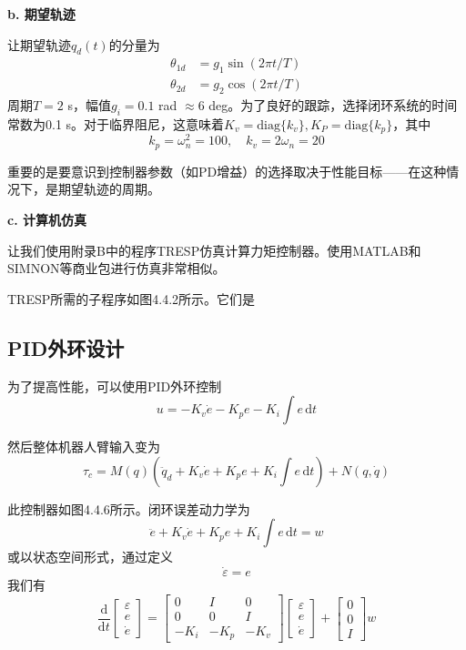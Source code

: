 \documentclass[UTF8]{ctexart}
\theoremstyle{definition}
\newcommand{\dd}{\mathrm{d}}
\begin{document}
\begin{examplebox}[示例4.4-1：PD计算力矩控制的仿真]
\textbf{b. 期望轨迹}

让期望轨迹$q_d(t)$的分量为
\begin{align}
    \theta_{1d} &= g_1\sin(2\pi t/T) \\
    \theta_{2d} &= g_2\cos(2\pi t/T)
\end{align}
周期$T = 2$ s，幅值$g_i = 0.1$ rad $\approx 6$ deg。为了良好的跟踪，选择闭环系统的时间常数为0.1 s。对于临界阻尼，这意味着$K_v = \mathrm{diag}\{k_v\}, K_P = \mathrm{diag}\{k_p\}$，其中
\begin{equation}
    k_p = \omega_n^2 = 100, \quad k_v = 2\omega_n = 20
\end{equation}

重要的是要意识到控制器参数（如PD增益）的选择取决于性能目标——在这种情况下，是期望轨迹的周期。

\textbf{c. 计算机仿真}

让我们使用附录B中的程序TRESP仿真计算力矩控制器。使用MATLAB和SIMNON等商业包进行仿真非常相似。

TRESP所需的子程序如图4.4.2所示。它们是
\end{examplebox}

\subsection{PID外环设计}

为了提高性能，可以使用PID外环控制
\begin{equation}
    u = -K_v\dot{e} - K_pe - K_i\int e\,\dd t
\end{equation}

然后整体机器人臂输入变为
\begin{equation}
    \tau_c = M(q)\left(\ddot{q}_d + K_v\dot{e} + K_pe + K_i\int e\,\dd t\right) + N(q, \dot{q})
\end{equation}

此控制器如图4.4.6所示。闭环误差动力学为
\begin{equation}
    \ddot{e} + K_v\dot{e} + K_pe + K_i\int e\,\dd t = w
\end{equation}
或以状态空间形式，通过定义
\begin{equation}
    \dot{\varepsilon} = e
\end{equation}
我们有
\begin{equation}
    \frac{\dd}{\dd t}\begin{bmatrix} \varepsilon \\ e \\ \dot{e} \end{bmatrix} = \begin{bmatrix} 0 & I & 0 \\ 0 & 0 & I \\ -K_i & -K_p & -K_v \end{bmatrix}\begin{bmatrix} \varepsilon \\ e \\ \dot{e} \end{bmatrix} + \begin{bmatrix} 0 \\ 0 \\ I \end{bmatrix}w
\end{equation}
\end{document}
